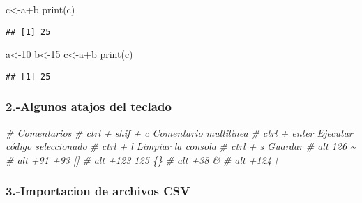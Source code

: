 \documentclass[
]{article}
\newenvironment{Shaded}{\begin{snugshade}}{\end{snugshade}}
\newcommand{\CommentTok}[1]{\textcolor[rgb]{0.56,0.35,0.01}{\textit{#1}}}
\newcommand{\DecValTok}[1]{\textcolor[rgb]{0.00,0.00,0.81}{#1}}
\newcommand{\FunctionTok}[1]{\textcolor[rgb]{0.00,0.00,0.00}{#1}}
\newcommand{\NormalTok}[1]{#1}
\newcommand{\OtherTok}[1]{\textcolor[rgb]{0.56,0.35,0.01}{#1}}
\newcommand{\SpecialCharTok}[1]{\textcolor[rgb]{0.00,0.00,0.00}{#1}}
\begin{document}
\begin{Shaded}
\begin{Highlighting}[]
\NormalTok{c}\OtherTok{\textless{}{-}}\NormalTok{a}\SpecialCharTok{+}\NormalTok{b}
\FunctionTok{print}\NormalTok{(c)}
\end{Highlighting}
\end{Shaded}

\begin{verbatim}
## [1] 25
\end{verbatim}

\begin{Shaded}
\begin{Highlighting}[]
\NormalTok{a}\OtherTok{\textless{}{-}}\DecValTok{10}
\NormalTok{b}\OtherTok{\textless{}{-}}\DecValTok{15}
\NormalTok{c}\OtherTok{\textless{}{-}}\NormalTok{a}\SpecialCharTok{+}\NormalTok{b}
\FunctionTok{print}\NormalTok{(c)}
\end{Highlighting}
\end{Shaded}

\begin{verbatim}
## [1] 25
\end{verbatim}

\hypertarget{algunos-atajos-del-teclado}{%
\subsubsection{\texorpdfstring{2.-Algunos atajos del teclado
}{2.-Algunos atajos del teclado  }}\label{algunos-atajos-del-teclado}}

\begin{Shaded}
\begin{Highlighting}[]
\CommentTok{\# Comentarios}
\CommentTok{\# ctrl + shif + c   Comentario multilinea}
\CommentTok{\# ctrl + enter Ejecutar código seleccionado}
\CommentTok{\# ctrl + l Limpiar la consola}
\CommentTok{\# ctrl + s Guardar}
\CommentTok{\# alt 126 \textasciitilde{}}
\CommentTok{\# alt +91 +93 []}
\CommentTok{\# alt +123  125 \{\}}
\CommentTok{\# alt +38 \&}
\CommentTok{\# alt +124 |}
\end{Highlighting}
\end{Shaded}

\hypertarget{importacion-de-archivos-csv}{%
\subsubsection{\texorpdfstring{3.-Importacion de archivos
CSV}{3.-Importacion de archivos CSV }}\label{importacion-de-archivos-csv}}
\end{document}
